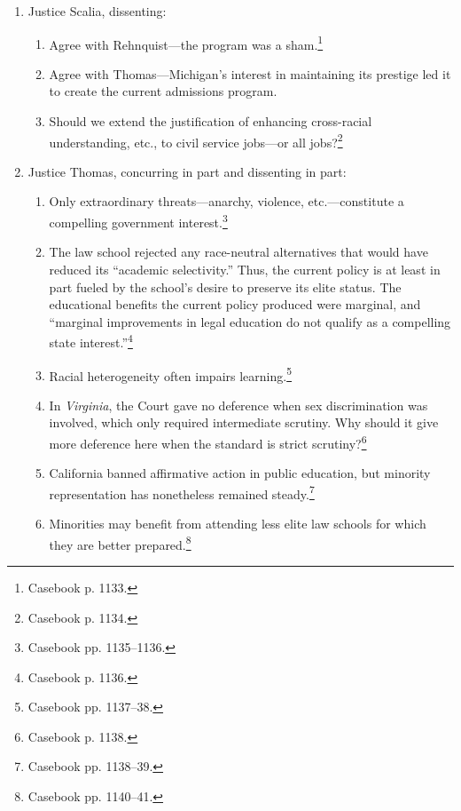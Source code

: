\begin{enumerate}
\begin{enumerate}
        burden under strict scrutiny.\footnote{Casebook p. 1132.}
        \item The Court gives too much deference. ``Deference is antithetical 
        to strict scrutiny, not consistent with it.''\footnote{Casebook p. 
        1133.}
    \end{enumerate}
    \item Justice Scalia, dissenting:
    \begin{enumerate}
        \item Agree with Rehnquist---the program was a 
        sham.\footnote{Casebook p. 1133.}
        \item Agree with Thomas---Michigan's interest in maintaining its 
        prestige led it to create the current admissions program. 
        \item Should we extend the justification of enhancing cross-racial 
        understanding, etc., to civil service jobs---or all 
        jobs?\footnote{Casebook p. 1134.}
    \end{enumerate}
    \item Justice Thomas, concurring in part and dissenting in part:
    \begin{enumerate}
        \item Only extraordinary threats---anarchy, violence, 
        etc.---constitute a compelling government interest.\footnote{Casebook 
        pp. 1135--1136.}
        \item The law school rejected any race-neutral alternatives that would 
        have reduced its ``academic selectivity.'' Thus, the current policy is 
        at least in part fueled by the school's desire to preserve its elite 
        status. The educational benefits the current policy produced were 
        marginal, and ``marginal improvements in legal education do not 
        qualify as a compelling state interest.''\footnote{Casebook p. 1136.}
        \item Racial heterogeneity often impairs learning.\footnote{Casebook 
        pp. 1137--38.}
        \item In \emph{Virginia}, the Court gave no deference when sex 
        discrimination was involved, which only required intermediate 
        scrutiny. Why should it give more deference here when the standard is 
        strict scrutiny?\footnote{Casebook p. 1138.}
        \item California banned affirmative action in public education, but 
        minority representation has nonetheless remained 
        steady.\footnote{Casebook pp. 1138--39.}
        \item Minorities may benefit from attending less elite law schools for 
        which they are better prepared.\footnote{Casebook pp. 1140--41.}
    \end{enumerate}
\end{enumerate}
 
